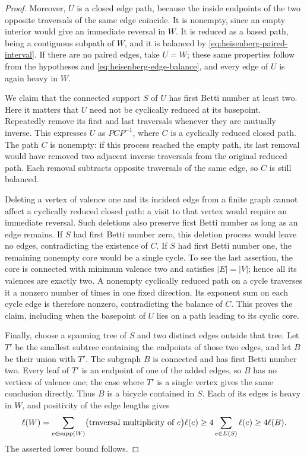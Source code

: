 \begin{proof}
Moreover, $U$ is a closed edge path, because the inside endpoints of the
two opposite traversals of the same edge coincide.  It is nonempty,
since an empty interior would give an immediate reversal in $W$.  It is
reduced as a based path, being a contiguous subpath of $W$, and it is
balanced by \eqref{eq:heisenberg-paired-interval}.  If there are no paired
edges, take $U=W$; these same properties follow from the hypotheses and
\eqref{eq:heisenberg-edge-balance}, and every edge of $U$ is again heavy
in $W$.

We claim that the connected support $S$ of $U$ has first Betti number at
least two.  Here it matters that $U$ need not be cyclically reduced at
its basepoint.  Repeatedly remove its first and last traversals whenever
they are mutually inverse.  This expresses $U$ as $P C P^{-1}$, where
$C$ is a cyclically reduced closed path.  The path $C$ is nonempty: if this
process reached the empty path, its last removal would have removed two
adjacent inverse traversals from the original reduced path.  Each
removal subtracts opposite traversals of the same edge, so $C$ is still
balanced.

Deleting a vertex of valence one and its incident edge from a finite
graph cannot affect a cyclically reduced closed path: a visit to that
vertex would require an immediate reversal.  Such deletions also
preserve first Betti number as long as an edge remains.  If $S$ had
first Betti number zero, this deletion process would leave no edges,
contradicting the existence of $C$.  If $S$ had first Betti number one,
the remaining nonempty core would be a single cycle.  To see the last
assertion, the core is connected with minimum valence two and satisfies
$|E|=|V|$; hence all its valences are exactly two.  A nonempty cyclically
reduced path on a cycle traverses it a nonzero number of times in one
fixed direction.  Its exponent sum on each cycle edge is therefore
nonzero, contradicting the balance of $C$.  This proves the claim,
including when the basepoint of $U$ lies on a path leading to its cyclic
core.

Finally, choose a spanning tree of $S$ and two distinct edges outside
that tree.  Let $T'$ be the smallest subtree containing the endpoints
of those two edges, and let $B$ be their union with $T'$.  The subgraph
$B$ is connected and has first Betti number two.  Every leaf of $T'$
is an endpoint of one of the added edges, so $B$ has no vertices of
valence one; the case where $T'$ is a single vertex gives the same
conclusion directly.  Thus $B$ is a bicycle contained in $S$.  Each
of its edges is heavy in $W$, and positivity of the edge lengths gives
\[
  \ell(W)
    =\sum_{e\in\operatorname{supp}(W)}
       \bigl(\text{traversal multiplicity of }e\bigr)\ell(e)
    \geq4\sum_{e\in E(S)}\ell(e)
    \geq4\ell(B).
\]
The asserted lower bound follows.
\end{proof}

